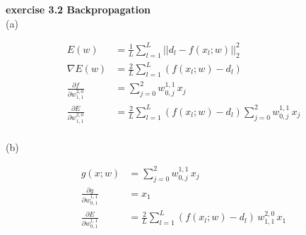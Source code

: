 \documentclass[a4paper,11pt]{article}
\title{}
\author{}
\begin{document}
\begin{flushleft}
\textbf{exercise 3.2 Backpropagation} \\
(a)  
\end{flushleft}

\begin{equation*}
\begin{aligned}
    E(w) &= \frac{1}{L} \sum_{l=1}^L || d_l - f(x_l;w) ||^2_2 \\
    \nabla E(w) &= \frac{2}{L} \sum_{l=1}^L (f(x_l;w) - d_l) \\
    \frac{\partial f}{\partial w_{1,1}^{2,0}} &= \sum_{j=0}^2 w_{0,j}^{1,1} \, x_j \\ 
    \frac{\partial E}{\partial w_{1,1}^{2,0}} &= \frac{2}{L} \sum_{l=1}^L (f(x_l;w) - d_l)  \sum_{j=0}^2 w_{0,j}^{1,1} \, x_j \\
\end{aligned}
\end{equation*}

\begin{flushleft}
(b)
\end{flushleft}

\begin{equation*}
\begin{aligned}
    g(x;w) &= \sum_{j=0}^2 w_{0,j}^{1,1} \, x_j \\
    \frac{\partial g}{\partial w_{0,1}^{1,1}} &= x_1 \\
    \frac{\partial E}{\partial w_{0,1}^{1,1}} &= \frac{2}{L} \sum_{l=1}^L (f(x_l;w) - d_l) \, w_{1,1}^{2,0} \, x_1 
\end{aligned}
\end{equation*}
\end{document}
